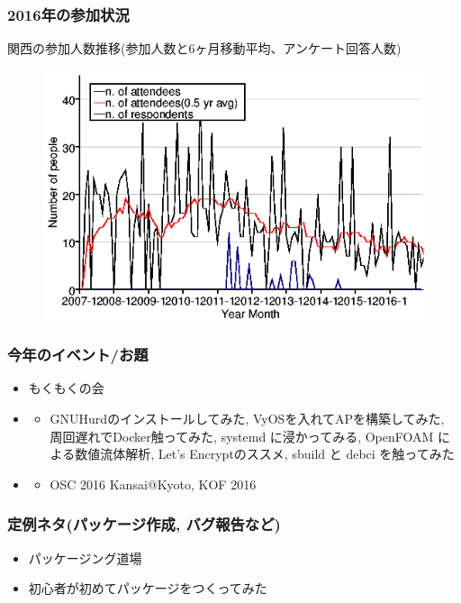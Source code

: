 \documentclass[cjk,dvipdfmx,10pt,compress,%
hyperref={bookmarks=true,bookmarksnumbered=true,bookmarksopen=false,%
colorlinks=false,%
pdftitle={第 117 回 関西 Debian 勉強会},%
pdfauthor={倉敷・のがた・佐々木・かわだ・おおつき},%
pdfsubject={資料},%
}]{beamer}
\begin{document}
\begin{frame}
  \frametitle{2016年の参加状況}
  \centering
  関西の参加人数推移(参加人数と6ヶ月移動平均、アンケート回答人数)
  \begin{figure}[h]
    \begin{center}
      \includegraphics[width=.6\hsize]{image201612/memberanalysis/kansai.png}
    \end{center}
  \end{figure}
\end{frame}

\begin{frame}
  \frametitle{今年のイベント/お題}
  \begin{itemize}
  \item もくもくの会
  \item \color[rgb]{1,0,0}{セッション}
    \begin{itemize}
    \item GNUHurdのインストールしてみた, VyOSを入れてAPを構築してみた,
      周回遅れでDocker触ってみた, systemd に浸かってみる, OpenFOAM による数値流体解析,
      Let's Encryptのススメ, sbuild と debci を触ってみた
    \end{itemize}
  \item \color[rgb]{0,0,1}{イベント}
    \begin{itemize}
    \item OSC 2016 Kansai@Kyoto, KOF 2016
    \end{itemize}
  \end{itemize}
\end{frame}

\begin{frame}
  \frametitle{定例ネタ(パッケージ作成, バグ報告など)}
  \begin{itemize}
  \item パッケージング道場
  \item 初心者が初めてパッケージをつくってみた
  \end{itemize}
\end{frame}
\end{document}
